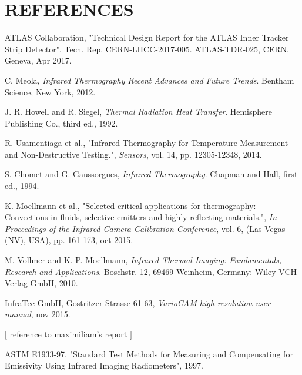 \pagestyle{references}

\section*{\uppercase{References}}\label{referen}
	\bigskip
	\bigskip
	\begin{enumerate}[label={[\arabic*]}]
	
		\item ATLAS Collaboration, "Technical Design Report for the ATLAS Inner Tracker Strip Detector", Tech. Rep. CERN-LHCC-2017-005. ATLAS-TDR-025, CERN, Geneva, Apr 2017.
		
		\item C. Meola,	\textit{Infrared Thermography Recent Advances and Future Trends}. Bentham Science, New York, 2012.
		
		\item J. R. Howell and R. Siegel, \textit{Thermal Radiation Heat Transfer}. Hemisphere Publishing Co., third ed., 1992.
		
		\item R. Usamentiaga et al., "Infrared Thermography for Temperature Measurement and Non-Destructive Testing.", \textit{Sensors}, vol. 14, pp. 12305-12348, 2014.
		 
		\item S. Chomet and G. Gaussorgues, \textit{Infrared Thermography}. Chapman and Hall, first ed., 1994.
		
		\item K. Moellmann et al., "Selected critical applications for thermography: Convections in fluids, selective emitters and highly reflecting materials.", \textit{In Proceedings of the Infrared Camera Calibration Conference}, vol. 6, (Las Vegas (NV), USA), pp. 161-173, oct 2015.
		
		\item M. Vollmer and K.-P. Moellmann,	\textit{Infrared Thermal Imaging: Fundamentals, Research and Applications}. Boschstr. 12, 69469 Weinheim, Germany: Wiley-VCH Verlag GmbH, 2010.
		
		\item InfraTec GmbH, Gostritzer Strasse 61-63, \textit{VarioCAM \textregistered\space high resolution user manual}, nov 2015.
		
		\item $[$ reference to maximiliam's report $]$
		
		\item ASTM E1933-97. "Standard Test Methods for Measuring and Compensating for Emissivity Using Infrared Imaging Radiometers", 1997.
		

\end{enumerate}
